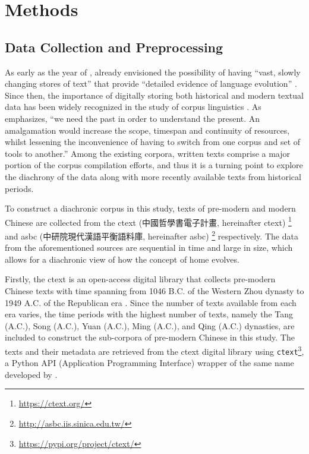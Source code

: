 

\chapter{Methods}
\label{methods}

\section{Data Collection and Preprocessing}
As early as the year of \citeyear{sinclair1982reflections}, \citeauthor{sinclair1982reflections} already envisioned the possibility of having ``vast, slowly changing stores of text'' that provide ``detailed evidence of language evolution'' . Since then, the importance of digitally storing both historical and modern textual data has been widely recognized in the study of corpus linguistics \parencite{renouf2002time}. As \textcite{renouf2002time} emphasizes, ``we need the past in order to understand the present. An amalgamation would increase the scope, timespan and continuity of resources, whilst lessening the inconvenience of having to switch from one corpus and set of tools to another.'' Among the existing corpora, written texts comprise a major portion of the corpus compilation efforts, and thus it is a turning point to explore the diachrony of the data along with more recently available texts from historical periods.

To construct a diachronic corpus in this study, texts of pre-modern and modern Chinese are collected from the \acrlong{ctext} (中國哲學書電子計畫, hereinafter \acrshort{ctext}) \parencite{sturgeon2019ctext}\footnote{\url{https://ctext.org/}} and \acrlong{asbc} (中研院現代漢語平衡語料庫, hereinafter \acrshort{asbc}) \parencite{chen1996sinica}\footnote{\url{http://asbc.iis.sinica.edu.tw/}} respectively. The data from the aforementioned sources are sequential in time and large in size, which allows for a diachronic view of how the concept of home evolves.

Firstly, the \acrlong{ctext} is an open-access digital library that collects pre-modern Chinese texts with time spanning from 1046 B.C. of the Western Zhou dynasty to 1949 A.C. of the Republican era \parencite{sturgeon2019ctext}. Since the number of texts available from each era varies, the time periods with the highest number of texts, namely the Tang (\tang\space A.C.), Song (\song\space A.C.), Yuan (\yuan\space A.C.), Ming (\ming\space A.C.), and Qing (\qing\space A.C.) dynasties, are included to construct the sub-corpora of pre-modern Chinese in this study. The texts and their metadata are retrieved from the \gls{ctext} digital library using \texttt{ctext}\footnote{\url{https://pypi.org/project/ctext/}}, a Python API (Application Programming Interface) wrapper of the same name developed by \textcite{ctextapi}.

